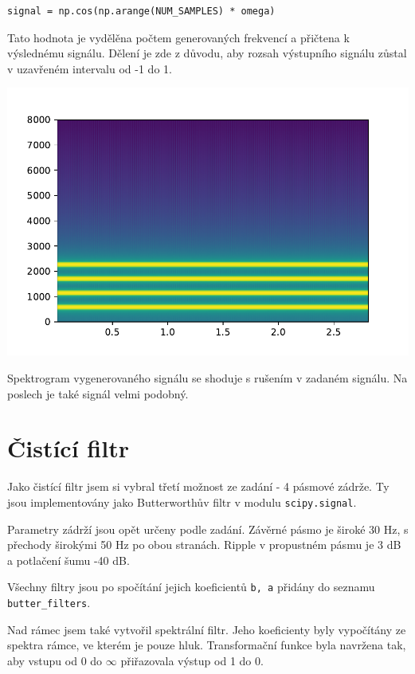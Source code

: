 \documentclass[12pt,a4paper]{article}
\begin{document}
		\begin{verbatim}
signal = np.cos(np.arange(NUM_SAMPLES) * omega)
		\end{verbatim}
		
		Tato hodnota je vydělěna počtem generovaných frekvencí a přičtena k výslednému signálu. 
		Dělení je zde z důvodu, aby rozsah výstupního signálu zůstal v uzavřeném intervalu od -1 do 1.
		
		\includegraphics{img/4cos_spec.pdf}
		
		Spektrogram vygenerovaného signálu se shoduje s rušením v zadaném signálu.
		Na poslech je také signál velmi podobný.
		
		\newpage
		
	
	
	\section{Čistící filtr}
		Jako čistící filtr jsem si vybral třetí možnost ze zadání - 4 pásmové zádrže.
		Ty jsou implementovány jako Butterworthův filtr v modulu \texttt{scipy.signal}. 
		
		Parametry zádrží jsou opět určeny podle zadání. 
		Závěrné pásmo je široké 30 Hz, s přechody širokými 50 Hz po obou stranách.
		Ripple v propustném pásmu je 3 dB a potlačení šumu -40 dB.
		
		Všechny filtry jsou po spočítání jejich koeficientů \texttt{b, a} přidány do seznamu \texttt{butter\_filters}.
		
		Nad rámec jsem také vytvořil spektrální filtr. Jeho koeficienty byly vypočítány ze spektra rámce, ve kterém je pouze hluk. Transformační funkce byla navržena tak, aby vstupu od 0 do \(\infty\) přiřazovala výstup od 1 do 0.
		
\end{document}
